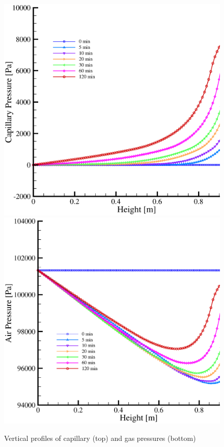 \begin{figure}[htb!]
\begin{center}
\includegraphics[scale=0.42]{HH/figures/liak_pc_profile.eps}
\includegraphics[scale=0.42]{HH/figures/liak_pg_profile.eps}
\end{center}
\caption{Vertical profiles of capillary (top) and gas pressures (bottom)}
\label{liak:p_pc}
\end{figure}

